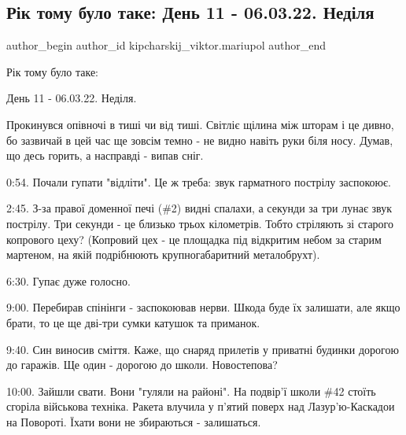  
 
 
 
 

\subsection{Рік тому  було таке:  День 11 - 06.03.22. Неділя}
\label{sec:06_03_2023.fb.kipcharskij_viktor.mariupol.1.r_k_tomu__bulo_take_}

\ifcmt
 author_begin
   author_id kipcharskij_viktor.mariupol
 author_end
\fi

Рік тому  було таке: 

День 11 - 06.03.22. Неділя.

Прокинувся опівночі в тиші чи від тиші. Світліє щілина між шторам і це дивно,
бо зазвичай в цей час ще зовсім темно - не видно навіть руки біля носу. Думав,
що десь горить, а насправді - випав сніг.

0:54. Почали гупати "відліти". Це ж треба: звук гарматного пострілу заспокоює.

2:45. З-за правої доменної печі (\#2) видні спалахи, а секунди за три лунає звук
пострілу. Три секунди - це близько трьох кілометрів. Тобто стріляють зі старого
копрового цеху? (Копровий цех - це площадка під відкритим небом за старим
мартеном, на якій подрібнюють крупногабаритний металобрухт).

6:30. Гупає дуже голосно.

9:00. Перебирав спінінги - заспокоював нерви. Шкода буде їх залишати, але якщо
брати, то це ще дві-три сумки катушок та приманок.

9:40. Син виносив сміття. Каже, що снаряд прилетів у приватні будинки дорогою
до гаражів. Ще один - дорогою до школи. Новостепова? 

10:00. Зайшли свати. Вони "гуляли на районі". На подвір'ї школи \#42 стоїть
сгоріла військова техніка. Ракета влучила у п'ятий поверх над Лазур'ю-Каскадои
на Повороті. Їхати вони не збираються - залишаться.

